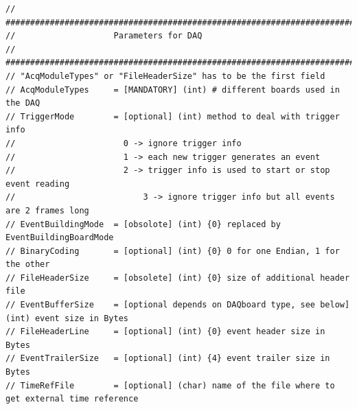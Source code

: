 \documentclass[a4paper, 12pt, twoside]{article}
\begin{document}
\begin{verbatim}
// #############################################################################
//                    Parameters for DAQ
// #############################################################################
// "AcqModuleTypes" or "FileHeaderSize" has to be the first field
// AcqModuleTypes     = [MANDATORY] (int) # different boards used in the DAQ
// TriggerMode        = [optional] (int) method to deal with trigger info
//                      0 -> ignore trigger info
//                      1 -> each new trigger generates an event
//                      2 -> trigger info is used to start or stop event reading
//			                3 -> ignore trigger info but all events are 2 frames long
// EventBuildingMode  = [obsolote] (int) {0} replaced by EventBuildingBoardMode
// BinaryCoding       = [optional] (int) {0} 0 for one Endian, 1 for the other
// FileHeaderSize     = [obsolete] (int) {0} size of additional header file
// EventBufferSize    = [optional depends on DAQboard type, see below] (int) event size in Bytes
// FileHeaderLine     = [optional] (int) {0} event header size in Bytes
// EventTrailerSize   = [optional] (int) {4} event trailer size in Bytes
// TimeRefFile        = [optional] (char) name of the file where to get external time reference


\end{verbatim}
\end{document}
